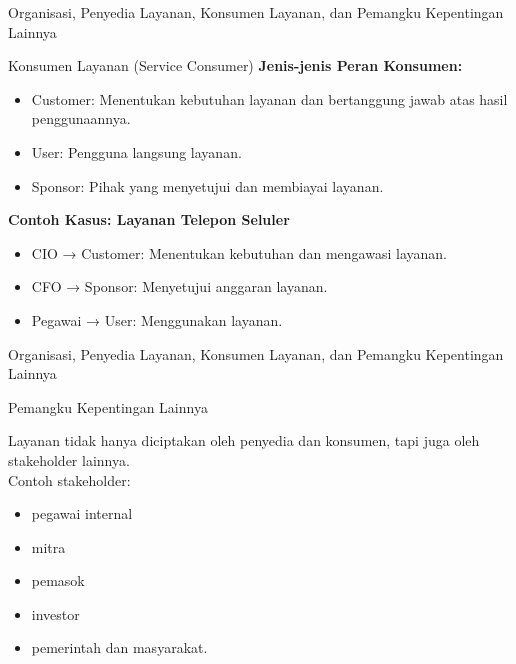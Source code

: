 \documentclass[aspectratio=179]{beamer}
\begin{document}
\begin{frame}{Organisasi, Penyedia Layanan, Konsumen Layanan, dan Pemangku Kepentingan Lainnya}
  \begin{block}{Konsumen Layanan (Service Consumer)}
    \textbf{Jenis-jenis Peran Konsumen:}
    \begin{itemize}
        \item Customer: Menentukan kebutuhan layanan dan bertanggung jawab atas hasil penggunaannya.
        \item User: Pengguna langsung layanan.
        \item Sponsor: Pihak yang menyetujui dan membiayai layanan.
    \end{itemize}
    \textbf{Contoh Kasus: Layanan Telepon Seluler}
    \begin{itemize}
        \item CIO → Customer: Menentukan kebutuhan dan mengawasi layanan.
        \item CFO → Sponsor: Menyetujui anggaran layanan.
        \item Pegawai → User: Menggunakan layanan.
    \end{itemize}
  \end{block}
\end{frame}

\begin{frame}{Organisasi, Penyedia Layanan, Konsumen Layanan, dan Pemangku Kepentingan Lainnya}
 \begin{block}{Pemangku Kepentingan Lainnya}
     {Layanan tidak hanya diciptakan oleh penyedia dan konsumen, tapi juga oleh stakeholder lainnya.\\
     Contoh stakeholder: 
     \begin{itemize}
         \item pegawai internal
         \item mitra
         \item pemasok
         \item investor
         \item pemerintah dan masyarakat.
     \end{itemize}
}
 \end{block}
    
\end{frame}
\end{document}
